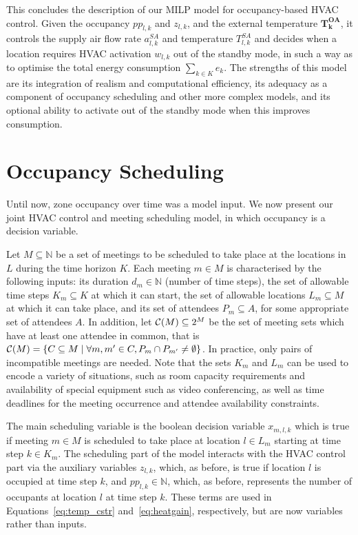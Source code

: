 This concludes the description of our MILP model for occupancy-based HVAC control. Given the occupancy $pp_{l,k}$ and $z_{l,k}$, and the
external temperature $\bm{T^{OA}_{k}}$, it controls the supply air flow rate $a^{SA}_{l,k}$ and temperature $T^{SA}_{l,k}$ and decides when a
location requires HVAC activation $w_{l,k}$ out of the standby mode, in such a way as to optimise the total energy consumption $\sum_{k\in
  K}e_k$. The strengths of this model are its integration of realism and computational efficiency, its adequacy as a component of occupancy
scheduling and other more complex models, and its optional ability to activate out of the standby mode when this improves consumption.

\vspace*{10ex}
\section{Occupancy Scheduling}
\label{sec:mip:scheduling}
Until now, zone occupancy over time was a model input. We now present our joint HVAC control and meeting scheduling model, in which occupancy is a decision variable.

Let $M \subseteq \mathbb{N}$ be a set of meetings to be scheduled to take place at the locations in $L$ during the time horizon $K$. Each meeting $m\in M$ is characterised by the following inputs: its duration $d_{m} \in \mathbb{N}$ (number of time steps), the set of allowable time steps $K_m \subseteq K$ at which it can start, the set of allowable locations $L_m\subseteq M$ at which it can take place, and its set of attendees $P_m \subseteq A$, for some appropriate set of attendees $A$. In addition, let ${\cal C}(M) \subseteq 2^{M}$ be the set of meeting sets which have at least one attendee in common, that is ${\cal C}(M)=\{C\subseteq M \mid \forall m,m'\in C, P_m\cap P_{m'} \neq \emptyset \}$.  In practice, only pairs of incompatible meetings are needed. Note that the sets $K_m$ and $L_m$ can be used to encode a variety of situations, such as room capacity requirements and availability of special equipment such as video conferencing, as well as time deadlines for the meeting occurrence and attendee availability constraints.

The main scheduling variable is the boolean decision variable $x_{m,l,k}$ which is true if meeting $m\in M$ is scheduled to take place at location $l\in L_m$ starting at time step $k\in K_m$. The scheduling part of the model interacts with the HVAC control part via the auxiliary variables $z_{l,k}$, which, as before, is true if location $l$ is occupied at time step $k$, and $pp_{l,k} \in \mathbb{N}$, which, as before, represents the number of occupants at location $l$ at time step $k$. These terms are used in Equations~\eqref{eq:temp_cstr} and~\eqref{eq:heatgain}, respectively, but are now variables rather than inputs.

